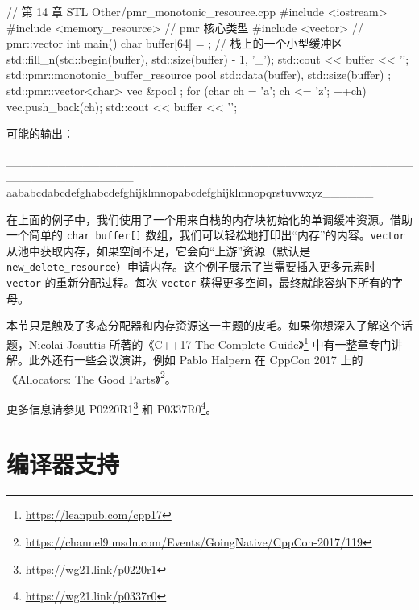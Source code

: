 \begin{codebox}[cpp]
// 第 14 章 STL Other/pmr_monotonic_resource.cpp
#include <iostream>
#include <memory_resource>
// pmr 核心类型
#include <vector>
// pmr::vector
int main() {
char buffer[64] = {}; // 栈上的一个小型缓冲区
std::fill_n(std::begin(buffer), std::size(buffer) - 1, '_');
std::cout << buffer << '\n';
std::pmr::monotonic_buffer_resource pool{ std::data(buffer), std::size(buffer) };
std::pmr::vector<char> vec{ &pool };
for (char ch = 'a'; ch <= 'z'; ++ch)
vec.push_back(ch);
std::cout << buffer << '\n';
}
\end{codebox}

可能的输出：

\begin{codebox}
_______________________________________________________________
aababcdabcdefghabcdefghijklmnopabcdefghijklmnopqrstuvwxyz______
\end{codebox}

在上面的例子中，我们使用了一个用来自栈的内存块初始化的单调缓冲资源。借助一个简单的 \texttt{char buffer[]} 数组，我们可以轻松地打印出“内存”的内容。\texttt{vector} 从池中获取内存，如果空间不足，它会向“上游”资源（默认是 \texttt{new\_delete\_resource}）申请内存。这个例子展示了当需要插入更多元素时 \texttt{vector} 的重新分配过程。每次 \texttt{vector} 获得更多空间，最终就能容纳下所有的字母。


本节只是触及了多态分配器和内存资源这一主题的皮毛。如果你想深入了解这个话题，Nicolai Josuttis 所著的《C++17 The Complete Guide》\footnote{\url{https://leanpub.com/cpp17}} 中有一整章专门讲解。此外还有一些会议演讲，例如 Pablo Halpern 在 CppCon 2017 上的《Allocators: The Good Parts》\footnote{\url{https://channel9.msdn.com/Events/GoingNative/CppCon-2017/119}}。

更多信息请参见 P0220R1\footnote{\url{https://wg21.link/p0220r1}} 和 P0337R0\footnote{\url{https://wg21.link/p0337r0}}。


\section{编译器支持}

